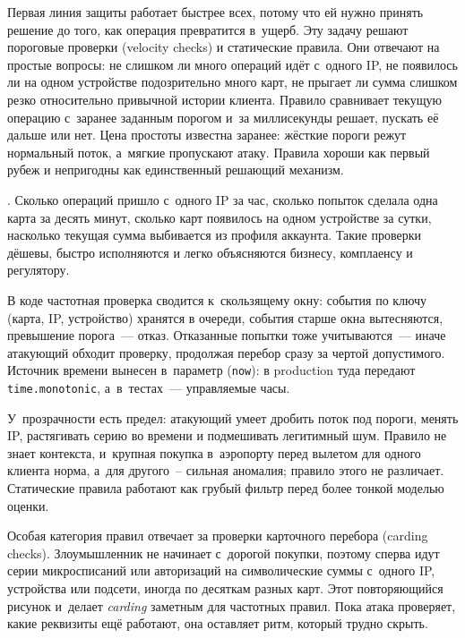 Первая линия защиты работает быстрее всех, потому что ей нужно принять
решение до того, как операция превратится в~ущерб. Эту задачу
решают пороговые проверки (velocity checks) и статические правила. Они
отвечают на простые вопросы: не слишком ли много операций идёт
с~одного IP, не появилось ли на одном устройстве подозрительно много
карт, не прыгает ли сумма слишком резко относительно привычной истории
клиента. Правило сравнивает текущую операцию с~заранее заданным
порогом и~за миллисекунды решает, пускать её дальше или нет. Цена
простоты известна заранее: жёсткие пороги режут нормальный поток,
а~мягкие пропускают атаку. Правила хороши как первый рубеж и непригодны
как единственный решающий механизм.

. Сколько операций пришло с~одного IP
за час, сколько попыток сделала одна карта за десять минут, сколько
карт появилось на одном устройстве за сутки, насколько текущая сумма
выбивается из профиля аккаунта. Такие проверки дёшевы, быстро
исполняются и легко объясняются бизнесу, комплаенсу и регулятору.

В коде частотная проверка сводится к~скользящему окну: события
по ключу (карта, IP, устройство) хранятся в очереди, события старше
окна вытесняются, превышение порога~--- отказ. Отказанные попытки
тоже учитываются~--- иначе атакующий обходит проверку, продолжая
перебор сразу за чертой допустимого. Источник времени вынесен
в~параметр (\texttt{now}): в production туда передают
\texttt{time.monotonic}, а~в~тестах~--- управляемые часы.


У~прозрачности есть предел: атакующий умеет дробить поток
под пороги, менять IP, растягивать серию во времени и подмешивать
легитимный шум.
Правило не знает контекста, и~крупная покупка в~аэропорту перед
вылетом для одного клиента норма, а~для другого~-- сильная аномалия;
правило этого не различает.
Статические правила работают как грубый фильтр перед более тонкой
моделью оценки.

Особая категория правил отвечает за проверки карточного перебора
(carding checks).
Злоумышленник не начинает с~дорогой покупки, поэтому сперва идут серии
микросписаний или авторизаций на символические суммы с~одного IP,
устройства или подсети, иногда по десяткам разных карт. Этот
повторяющийся рисунок и~делает \textit{carding} заметным для частотных правил.
Пока атака проверяет, какие реквизиты ещё работают, она оставляет
ритм, который трудно скрыть.

